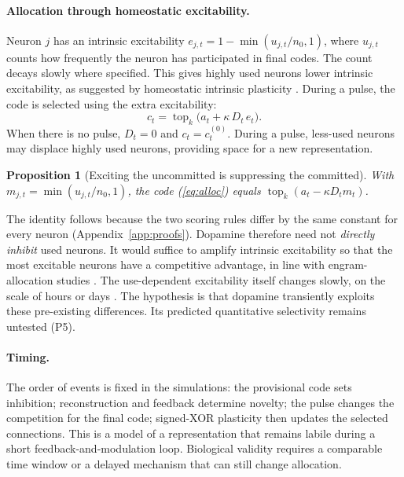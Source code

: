 \documentclass[11pt,a4paper]{article}
\newcommand{\topk}{\operatorname{top}_k}
\newtheorem{proposition}{Proposition}
\begin{document}
\paragraph{Allocation through homeostatic excitability.}
Neuron $j$ has an intrinsic excitability $e_{j,t}=1-\min(u_{j,t}/n_0,1)$, where $u_{j,t}$ counts how frequently the neuron has participated in final codes. The count decays slowly where specified. This gives highly used neurons lower intrinsic excitability, as suggested by homeostatic intrinsic plasticity \citep{desai1999,turrigiano2008}. During a pulse, the code is selected using the extra excitability:
\begin{equation}
 c_t=\topk\big(a_t+\kappa\,D_t\,e_t\big).
 \label{eq:alloc}
\end{equation}
When there is no pulse, $D_t=0$ and $c_t=c^{(0)}_t$. During a pulse, less-used neurons may displace highly used neurons, providing space for a new representation.

\begin{proposition}[Exciting the uncommitted is suppressing the committed]\label{prop:equiv}
With $m_{j,t}=\min(u_{j,t}/n_0,1)$, the code (\ref{eq:alloc}) equals $\topk(a_t-\kappa D_tm_t)$.
\end{proposition}

The identity follows because the two scoring rules differ by the same constant for every neuron (Appendix~\ref{app:proofs}). Dopamine therefore need not \emph{directly inhibit} used neurons. It would suffice to amplify intrinsic excitability so that the most excitable neurons have a competitive advantage, in line with engram-allocation studies \citep{josselyn2018,yiu2014}. The use-dependent excitability itself changes slowly, on the scale of hours or days \citep{desai1999}. The hypothesis is that dopamine transiently exploits these pre-existing differences. Its predicted quantitative selectivity remains untested (P5).

\paragraph{Timing.}
The order of events is fixed in the simulations: the provisional code sets inhibition; reconstruction and feedback determine novelty; the pulse changes the competition for the final code; signed-XOR plasticity then updates the selected connections. This is a model of a representation that remains labile during a short feedback-and-modulation loop. Biological validity requires a comparable time window or a delayed mechanism that can still change allocation.
\end{document}
